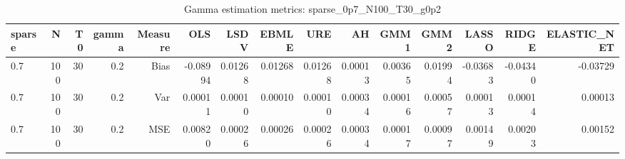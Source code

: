 \begin{table}[!htbp]\centering
\caption{Gamma estimation metrics: sparse_0p7_N100_T30_g0p2}
\label{tab:table1_sparse_0p7_N100_T30_g0p2}
\begin{tabular}{lrrrrrrrrrrrrrr}
\hline
sparse & N & T0 & gamma & Measure & OLS & LSDV & EBMLE & URE & AH & GMM1 & GMM2 & LASSO & RIDGE & ELASTIC_NET \\
\hline
0.7 & 100 & 30 & 0.2 & Bias & -0.08994 & 0.01268 & 0.01268 & 0.01268 & 0.00013 & 0.00365 & 0.01994 & -0.03683 & -0.04340 & -0.03729 \\
0.7 & 100 & 30 & 0.2 & Var & 0.00011 & 0.00010 & 0.00010 & 0.00010 & 0.00034 & 0.00016 & 0.00057 & 0.00013 & 0.00014 & 0.00013 \\
0.7 & 100 & 30 & 0.2 & MSE & 0.00820 & 0.00026 & 0.00026 & 0.00026 & 0.00034 & 0.00017 & 0.00097 & 0.00149 & 0.00203 & 0.00152 \\
\hline
\end{tabular}
\end{table}

